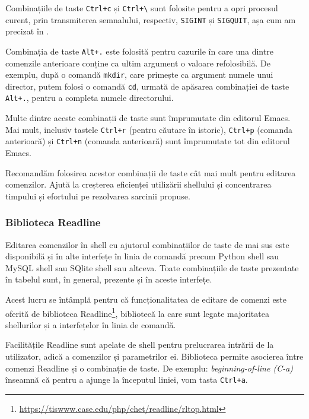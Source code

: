Combinațiile de taste \texttt{Ctrl+c} și \texttt{Ctrl+\textbackslash{}} sunt folosite pentru a opri procesul curent, prin transmiterea semnalului, respectiv, \texttt{SIGINT} și \texttt{SIGQUIT}, așa cum am precizat în \label{sec:process:signal}.

Combinația de taste \texttt{Alt+.} este folosită pentru cazurile în care una dintre comenzile anterioare conține ca ultim argument o valoare refolosibilă. De exemplu, după o comandă \texttt{mkdir}, care primește ca argument numele unui director, putem folosi o comandă \texttt{cd}, urmată de apăsarea combinației de taste \texttt{Alt+.}, pentru a completa numele directorului.

Multe dintre aceste combinații de taste sunt împrumutate din editorul Emacs. Mai mult,
inclusiv tastele \texttt{Ctrl+r} (pentru căutare în istoric), \texttt{Ctrl+p} (comanda anterioară)
și \texttt{Ctrl+n} (comanda anterioară) sunt împrumutate tot din editorul Emacs.

Recomandăm folosirea acestor combinații de taste cât mai mult pentru editarea
comenzilor. Ajută la creșterea eficienței utilizării shellului și concentrarea
timpului și efortului pe rezolvarea sarcinii propuse.

\subsubsection{Biblioteca Readline}
\label{sec:cli:shell:features:readline}

Editarea comenzilor în shell cu ajutorul combinațiilor de taste de mai sus este
disponibilă și în alte interfețe în linia de comandă precum Python shell sau
MySQL shell sau SQlite shell sau altceva. Toate combinațiile de taste prezentate în tabelul  sunt, în general, prezente și în
aceste interfețe.

Acest lucru se întâmplă pentru că funcționalitatea de editare de comenzi este
oferită de biblioteca Readline\footnote{\url{https://tiswww.case.edu/php/chet/readline/rltop.html}}, bibliotecă la care sunt legate majoritatea
shellurilor și a interfețelor în linia de comandă.

Facilitățile Readline sunt apelate de shell pentru prelucrarea intrării de la
utilizator, adică a comenzilor și parametrilor ei. Biblioteca permite asocierea
între comenzi Readline și o combinație de taste. De exemplu: \textit{beginning-of-line
(C-a)} înseamnă că pentru a ajunge la începutul liniei, vom tasta \texttt{Ctrl+a}.

